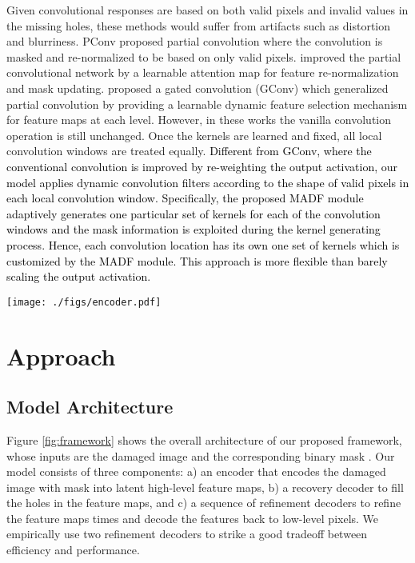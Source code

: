 \documentclass[journal]{IEEEtran}
\begin{document}
Given convolutional responses are based on both valid pixels and invalid values in the missing holes, these methods would suffer from artifacts such as distortion and blurriness. PConv \cite{liu2018image} proposed partial convolution where the convolution is masked and re-normalized to be based on only valid pixels. \cite{chaohaoLBAM2019} improved the partial convolutional network by a learnable attention map for feature re-normalization and mask updating. \cite{yu2019free} proposed a gated convolution (GConv) which generalized partial convolution by providing a learnable dynamic feature selection mechanism for feature maps at each level. However, in these works the vanilla convolution operation is still unchanged. Once the kernels are learned and fixed, all local convolution windows are treated equally. 
\textcolor{black}{
Different from GConv, where the conventional convolution is improved by re-weighting the output activation, our model applies dynamic convolution filters according to the shape of valid pixels in each local convolution window. Specifically, the proposed MADF module adaptively generates one particular set of kernels for each of the convolution windows and the mask information is exploited during the kernel generating process. Hence, each convolution location has its own one set of kernels which is customized by the MADF module. This approach is more flexible than barely scaling the output activation.  
}

\begin{figure*}[!t]
    \centering
    \texttt{[image: ./figs/encoder.pdf]}
    \caption{{\color{black}{The details of encoder. ``k*'' denotes kernel size, ``s*'' denotes stride, ``conv-*'' denotes * output channels. The green blocks contain dynamic convolution operations of MADF.}}}
    \label{fig:encoder}
\end{figure*}
\section{Approach}
\subsection{Model Architecture}
Figure \ref{fig:framework} shows the overall architecture of our proposed framework, whose inputs are the damaged image  and the corresponding binary mask . 
Our model consists of three components: a) an encoder  that encodes the damaged image with mask into latent high-level feature maps, b) a recovery decoder  to fill the holes in the feature maps, and c) a sequence of refinement decoders  to refine the feature maps  times and decode the features back to low-level pixels. We empirically use two refinement decoders to strike a good tradeoff between efficiency and performance. 
\end{document}
